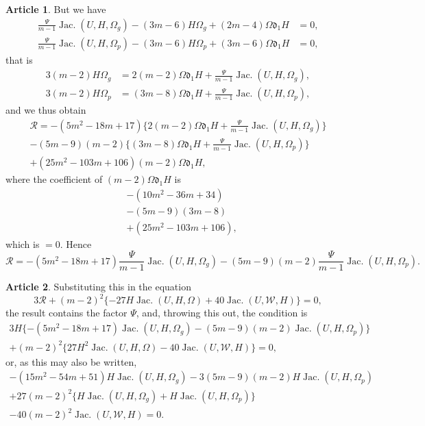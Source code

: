 \documentclass[12pt,a4paper]{article}
\theoremstyle{definition}
\newtheorem{art}{Article}[section]
\DeclareMathOperator{\Jac}{Jac.}
\begin{document}
\begin{art}
But we have
\begin{align*}
\frac{\Psi}{m - 1}\Jac(U, H, \Omega_g) - (3m - 6)H\Omega_g + (2m - 4)\Omega\mathfrak{d}_1 H &= 0, \tag{J} \\
\frac{\Psi}{m - 1}\Jac(U, H, \Omega_p) - (3m - 6)H\Omega_p + (3m - 6)\Omega\mathfrak{d}_1 H &= 0, \tag{J}
\end{align*}
that is
\begin{align*}
3(m - 2)H\Omega_g &= 2(m - 2)\Omega\mathfrak{d}_1 H + \frac{\Psi}{m - 1}\Jac(U, H, \Omega_g), \\
3(m - 2)H\Omega_p &= (3m - 8)\Omega\mathfrak{d}_1 H + \frac{\Psi}{m - 1}\Jac(U, H, \Omega_p),
\end{align*}
and we thus obtain
\begin{multline*}
\mathcal{R} = -(5m^2 - 18m + 17)\{2(m - 2)\Omega\mathfrak{d}_1 H + \frac{\Psi}{m - 1}\Jac(U, H, \Omega_g)\} \\
- (5m - 9)(m - 2)\{(3m - 8)\Omega\mathfrak{d}_1 H + \frac{\Psi}{m - 1}\Jac(U, H, \Omega_p)\} \\
+ (25m^2 - 103m + 106)(m - 2)\Omega\mathfrak{d}_1 H,
\end{multline*}
where the coefficient of $(m - 2)\Omega\mathfrak{d}_1 H$ is
\begin{align*}
&-(10m^2 - 36m + 34) \\
&-(5m - 9)(3m - 8) \\
&+ (25m^2 - 103m + 106),
\end{align*}
which is $= 0$. Hence
\[
\mathcal{R} = -(5m^2 - 18m + 17)\frac{\Psi}{m - 1}\Jac(U, H, \Omega_g) - (5m - 9)(m - 2)\frac{\Psi}{m - 1}\Jac(U, H, \Omega_p).
\]
\end{art}

\begin{art}
Substituting this in the equation
\[
3\mathcal{R} + (m - 2)^2\{-27H\Jac(U, H, \Omega) + 40\Jac(U, \mathcal{W}, H)\} = 0,
\]
the result contains the factor $\Psi$, and, throwing this out, the condition is
\begin{multline*}
3H\{-(5m^2 - 18m + 17)\Jac(U, H, \Omega_g) - (5m - 9)(m - 2)\Jac(U, H, \Omega_p)\} \\
+ (m - 2)^2\{27H^2\Jac(U, H, \Omega) - 40\Jac(U, \mathcal{W}, H)\} = 0,
\end{multline*}
or, as this may also be written,
\begin{multline*}
-(15m^2 - 54m + 51)H\Jac(U, H, \Omega_g) - 3(5m - 9)(m - 2)H\Jac(U, H, \Omega_p) \\
+ 27(m - 2)^2\{H\Jac(U, H, \Omega_g) + H\Jac(U, H, \Omega_p)\} \\
- 40(m - 2)^2\Jac(U, \mathcal{W}, H) = 0.
\end{multline*}
\end{art}
\end{document}
